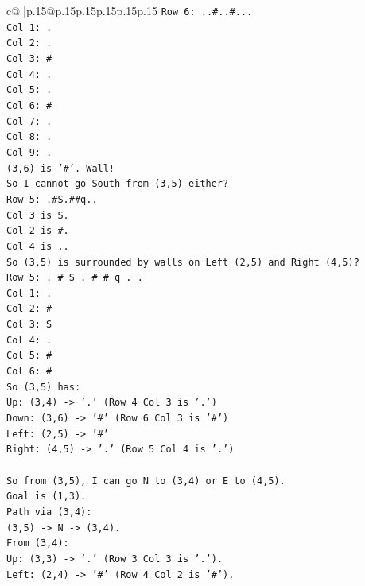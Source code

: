 \documentclass{article}
\begin{document}
{\begin{supertabular}{c@{$\;$}|p{.15\linewidth}@{}p{.15\linewidth}p{.15\linewidth}p{.15\linewidth}p{.15\linewidth}p{.15\linewidth}}
{{{\texttt{Row 6: ..\#..\#...} \\
\texttt{Col 1: .} \\
\texttt{Col 2: .} \\
\texttt{Col 3: \#} \\
\texttt{Col 4: .} \\
\texttt{Col 5: .} \\
\texttt{Col 6: \#} \\
\texttt{Col 7: .} \\
\texttt{Col 8: .} \\
\texttt{Col 9: .} \\
\texttt{(3,6) is '\#'. Wall!} \\
\texttt{So I cannot go South from (3,5) either?} \\
\texttt{Row 5: .\#S.\#\#q..} \\
\texttt{Col 3 is S.} \\
\texttt{Col 2 is \#.} \\
\texttt{Col 4 is ..} \\
\texttt{So (3,5) is surrounded by walls on Left (2,5) and Right (4,5)?} \\
\texttt{Row 5: . \# S . \# \# q . .} \\
\texttt{Col 1: .} \\
\texttt{Col 2: \#} \\
\texttt{Col 3: S} \\
\texttt{Col 4: .} \\
\texttt{Col 5: \#} \\
\texttt{Col 6: \#} \\
\texttt{So (3,5) has:} \\
\texttt{Up: (3,4) {-}> '.' (Row 4 Col 3 is '.')} \\
\texttt{Down: (3,6) {-}> '\#' (Row 6 Col 3 is '\#')} \\
\texttt{Left: (2,5) {-}> '\#'} \\
\texttt{Right: (4,5) {-}> '.' (Row 5 Col 4 is '.')} \\
\\ 
\texttt{So from (3,5), I can go N to (3,4) or E to (4,5).} \\
\texttt{Goal is (1,3).} \\
\texttt{Path via (3,4):} \\
\texttt{(3,5) {-}> N {-}> (3,4).} \\
\texttt{From (3,4):} \\
\texttt{Up: (3,3) {-}> '.' (Row 3 Col 3 is '.').} \\
\texttt{Left: (2,4) {-}> '\#' (Row 4 Col 2 is '\#').} \\
}}}
\end{supertabular}}
\end{document}
